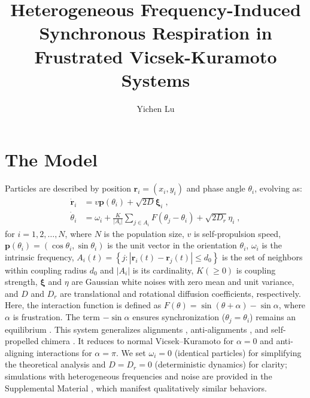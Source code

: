 \documentclass{article}
\title{\textbf{Heterogeneous Frequency-Induced Synchronous Respiration in Frustrated Vicsek-Kuramoto Systems}}
\author{Yichen Lu}
\begin{document}
\maketitle

\tableofcontents

\section{The Model}

Particles are described by position $\mathbf{r}_i=\left( x_i, y_i \right)$ and phase angle $\theta_i$, evolving as:
\begin{subequations} 
    \label{eq:totalDynamicsMeanField}
    \begin{align}
        \dot{\mathbf{r}}_i&=v\mathbf{p}\left( \theta _i \right)+\sqrt{2D}\bm{\xi}_i\;\label{eq:dotR},
        \\
        \dot{\theta}_i&=\omega_i+\frac{K}{\left| A_i \right|}\sum_{j\in A_i}{F\left( \theta _j-\theta _i \right) }+\sqrt{2D_r}\eta _i\;\label{eq:dotTheta},
    \end{align}
\end{subequations}
for $i=1,2,\ldots,N$, where $N$ is the population size, $v$ is self-propulsion speed, $\mathbf{p}\left( \theta _i \right) =\left( \cos \theta _i,\sin \theta _i \right)$ is the unit vector in the orientation $\theta_i$, $\omega_i$ is the intrinsic frequency, $A_i\left( t \right) =\left\{ j: \left| \mathbf{r}_i\left( t \right) -\mathbf{r}_j\left( t \right) \right|\leqslant d_0 \right\}$ is the set of neighbors within coupling radius $d_0$ and $|A_i|$ is its cardinality, $K \left(\geqslant 0\right)$ is coupling strength, $\bm{\xi}$ and $\eta$ are Gaussian white noises with zero mean and unit variance, and $D$ and $D_r$ are translational and rotational diffusion coefficients, respectively. 
Here, the interaction function is defined as $F\left( \theta \right) =\sin \left( \theta +\alpha \right) -\sin \alpha $, where $\alpha$ is frustration.
The term $-\sin\alpha$ ensures synchronization ($\theta_j = \theta_i$) remains an equilibrium \cite{10.1143/PTP.79.1069}. 
This system generalizes alignments \cite{PhysRevLett.119.058002,PhysRevResearch.1.023026,Escaff2020,PhysRevLett.127.238001,PhysRevLett.133.258302}, anti-alignments \cite{PhysRevE.109.024602,PhysRevE.110.024603}, and self-propelled chimera \cite{PhysRevE.98.032219,PhysRevE.102.022604}. It reduces to normal Vicsek–Kuramoto for $\alpha=0$ and anti-aligning interactions for $\alpha=\pi$.
We set $\omega_i=0$ (identical particles) for simplifying the theoretical analysis and $D=D_r=0$ (deterministic dynamics) for clarity; simulations with heterogeneous frequencies and noise are provided in the Supplemental Material \cite{mycomment2023}, which manifest qualitatively similar behaviors.
\end{document}
